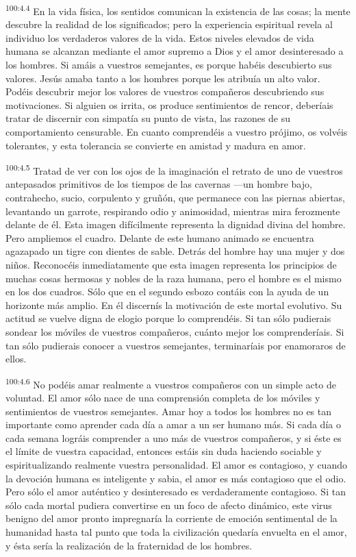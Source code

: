 \par
\textsuperscript{100:4.4} En la vida física, los sentidos comunican la existencia de las cosas; la mente descubre la realidad de los significados; pero la experiencia espiritual revela al individuo los verdaderos valores de la vida. Estos niveles elevados de vida humana se alcanzan mediante el amor supremo a Dios y el amor desinteresado a los hombres. Si amáis a vuestros semejantes, es porque habéis descubierto sus valores. Jesús amaba tanto a los hombres porque les atribuía un alto valor. Podéis descubrir mejor los valores de vuestros compañeros descubriendo sus motivaciones. Si alguien os irrita, os produce sentimientos de rencor, deberíais tratar de discernir con simpatía su punto de vista, las razones de su comportamiento censurable. En cuanto comprendéis a vuestro prójimo, os volvéis tolerantes, y esta tolerancia se convierte en amistad y madura en amor.

\par
\textsuperscript{100:4.5} Tratad de ver con los ojos de la imaginación el retrato de uno de vuestros antepasados primitivos de los tiempos de las cavernas ---un hombre bajo, contrahecho, sucio, corpulento y gruñón, que permanece con las piernas abiertas, levantando un garrote, respirando odio y animosidad, mientras mira ferozmente delante de él. Esta imagen difícilmente representa la dignidad divina del hombre. Pero ampliemos el cuadro. Delante de este humano animado se encuentra agazapado un tigre con dientes de sable. Detrás del hombre hay una mujer y dos niños. Reconocéis inmediatamente que esta imagen representa los principios de muchas cosas hermosas y nobles de la raza humana, pero el hombre es el mismo en los dos cuadros. Sólo que en el segundo esbozo contáis con la ayuda de un horizonte más amplio. En él discernís la motivación de este mortal evolutivo. Su actitud se vuelve digna de elogio porque lo comprendéis. Si tan sólo pudierais sondear los móviles de vuestros compañeros, cuánto mejor los comprenderíais. Si tan sólo pudierais conocer a vuestros semejantes, terminaríais por enamoraros de ellos.

\par
\textsuperscript{100:4.6} No podéis amar realmente a vuestros compañeros con un simple acto de voluntad. El amor sólo nace de una comprensión completa de los móviles y sentimientos de vuestros semejantes. Amar hoy a todos los hombres no es tan importante como aprender cada día a amar a un ser humano más. Si cada día o cada semana lográis comprender a uno más de vuestros compañeros, y si éste es el límite de vuestra capacidad, entonces estáis sin duda haciendo sociable y espiritualizando realmente vuestra personalidad. El amor es contagioso, y cuando la devoción humana es inteligente y sabia, el amor es más contagioso que el odio. Pero sólo el amor auténtico y desinteresado es verdaderamente contagioso. Si tan sólo cada mortal pudiera convertirse en un foco de afecto dinámico, este virus benigno del amor pronto impregnaría la corriente de emoción sentimental de la humanidad hasta tal punto que toda la civilización quedaría envuelta en el amor, y ésta sería la realización de la fraternidad de los hombres.

